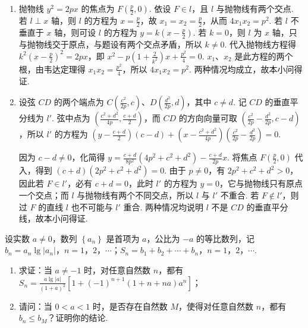 \begin{solution}

\begin{enumerate}
\item 抛物线 \(y^{2}=2px\) 的焦点为 \(F\left(\frac{p}{2},0\right)\). 依设 \(F\in l\)，且 \(l\) 与抛物线有两个交点. 若 \(l\perp x\) 轴，则 \(l\) 的方程为 \(x=\frac{p}{2}\)，故 \(x_{1}=x_{2}=\frac{p}{2}\)，从而 \(4x_{1}x_{2}=p^{2}\). 若 \(l\) 不垂直于 \(x\) 轴，则可设 \(l\) 的方程为 \(y=k\left(x-\frac{p}{2}\right)\). 若 \(k=0\)，则 \(l\) 为 \(x\) 轴，只与抛物线交于原点，与题设有两个交点矛盾，所以 \(k\neq0\). 代入抛物线方程得 \(k^{2}\left(x-\frac{p}{2}\right)^{2}=2px\)，即 \(x^{2}-p\left(1+\frac{2}{k^{2}}\right)x+\frac{p^{2}}{4}=0\). \(x_{1}\)、\(x_{2}\) 是此方程的两个根，由韦达定理得 \(x_{1}x_{2}=\frac{p^{2}}{4}\)，所以 \(4x_{1}x_{2}=p^{2}\). 两种情况均成立，故本小问得证.

\item 设弦 \(CD\) 的两个端点为 \(C\left(\frac{c^{2}}{2p},c\right)\)、\(D\left(\frac{d^{2}}{2p},d\right)\)，其中 \(c\neq d\). 记 \(CD\) 的垂直平分线为 \(l'\). 弦中点为 \(\left(\frac{c^{2}+d^{2}}{4p},\frac{c+d}{2}\right)\)，而 \(CD\) 的方向向量可取 \(\left(\frac{c^{2}}{2p}-\frac{d^{2}}{2p},c-d\right)\)，所以 \(l'\) 的方程为
\(\left(y-\frac{c+d}{2}\right)(c-d)+\left(x-\frac{c^{2}+d^{2}}{4p}\right)\left(\frac{c^{2}}{2p}-\frac{d^{2}}{2p}\right)=0\).

因为 \(c-d\neq0\)，化简得 \(y=\frac{c+d}{8p^{2}}\left(4p^{2}+c^{2}+d^{2}\right)-\frac{c+d}{2p}x\). 将焦点 \(F\left(\frac{p}{2},0\right)\) 代入，得到 \((c+d)(2p^{2}+c^{2}+d^{2})=0\). 由于 \(p\neq0\)，有 \(2p^{2}+c^{2}+d^{2}>0\)，因此若 \(F\in l'\)，必有 \(c+d=0\)，此时 \(l'\) 的方程为 \(y=0\)，它与抛物线只有原点一个交点；而 \(l\) 与抛物线有两个不同交点，所以 \(l\) 与 \(l'\) 不重合. 若 \(F\notin l'\)，则过 \(F\) 的直线 \(l\) 也不可能与 \(l'\) 重合. 两种情况均说明 \(l\) 不是 \(CD\) 的垂直平分线，故本小问得证.
\end{enumerate}

\end{solution}

\begin{problem}

设实数 \(a \neq 0\)，数列 \(\left\{a_n\right\}\) 是首项为 \(a\)，公比为 \(-a\) 的等比数列，记 \(b_n = a_n \lg \left|a_n\right|\)，\(n = 1\)，\(2\)，\(\cdots\)；\(S_n = b_1 + b_2 + \cdots + b_n\)，\(n = 1\)，\(2\)，\(\cdots\).

\begin{enumerate}
\item 求证：当 \(a \neq -1\) 时，对任意自然数 \(n\)，都有 \(S_{n} = \frac{a \lg |a|}{(1 + a)^{2}} \left[ 1 + (-1)^{n+1} (1 + n + na) a^{n} \right]\)；
\item 请问：当 \(0<a<1\) 时，是否存在自然数 \(M\)，使得对任意自然数 \(n\)，都有 \(b_{n}\leqslant b_{M}\)？证明你的结论.
\end{enumerate}
\end{problem}


